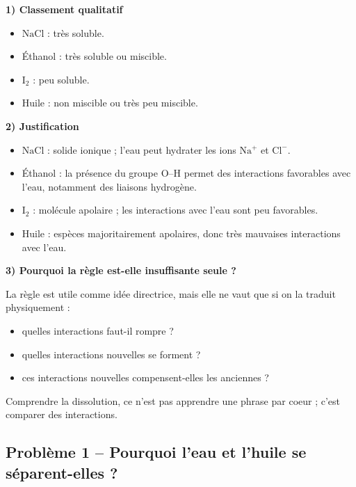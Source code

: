 \documentclass[11pt,a4paper]{article}
\begin{document}
\begin{corrigebox}
\textbf{1) Classement qualitatif}

\begin{itemize}
    \item \(\mathrm{NaCl}\) : très soluble.
    \item Éthanol : très soluble ou miscible.
    \item \(\mathrm{I_2}\) : peu soluble.
    \item Huile : non miscible ou très peu miscible.
\end{itemize}

\textbf{2) Justification}

\begin{itemize}
    \item \(\mathrm{NaCl}\) : solide ionique ; l'eau peut hydrater les ions \(\mathrm{Na^+}\) et \(\mathrm{Cl^-}\).
    \item Éthanol : la présence du groupe O--H permet des interactions favorables avec l'eau, notamment des liaisons hydrogène.
    \item \(\mathrm{I_2}\) : molécule apolaire ; les interactions avec l'eau sont peu favorables.
    \item Huile : espèces majoritairement apolaires, donc très mauvaises interactions avec l'eau.
\end{itemize}

\textbf{3) Pourquoi la règle est-elle insuffisante seule ?}

La règle est utile comme idée directrice, mais elle ne vaut que si on la traduit physiquement :
\begin{itemize}
    \item quelles interactions faut-il rompre ?
    \item quelles interactions nouvelles se forment ?
    \item ces interactions nouvelles compensent-elles les anciennes ?
\end{itemize}

\begin{methodebox}
Comprendre la dissolution, ce n'est pas apprendre une phrase par coeur ; c'est comparer des interactions.
\end{methodebox}
\end{corrigebox}

\subsection{Problème 1 -- Pourquoi l'eau et l'huile se séparent-elles ?}
\end{document}
